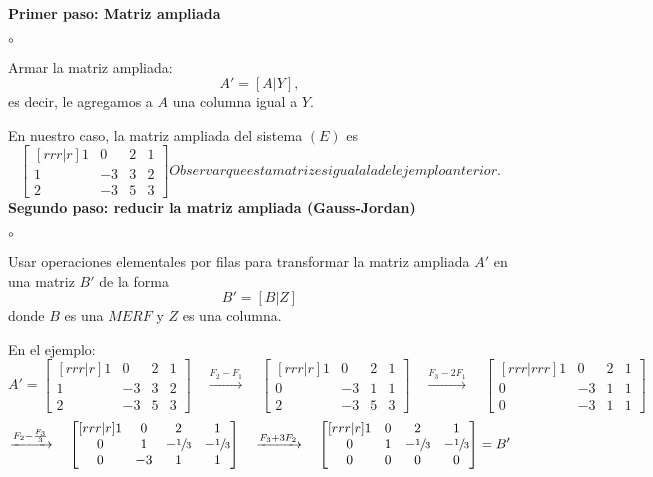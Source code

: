 \documentclass{article}
\theoremstyle{definition}
\theoremstyle{definition}
\theoremstyle{remark}
\begin{document}
\textbf{Primer paso: Matriz ampliada}
\begin{list}{$\circ$}{}  
\item  Armar la matriz ampliada: \[
    A'=[A|Y],
  \]
  es decir, le agregamos a $A$ una columna igual a $Y$.
\end{list}
En nuestro caso, la matriz ampliada del sistema $(E)$ es \[
  \begin{bmatrix}[rrr|r] 
    1 & 0 & 2 & 1 \\
    1 & -3 & 3 & 2 \\
    2 & -3 & 5 & 3 
  \end{bmatrix}
Observar que esta matriz es igual a la del ejemplo anterior.
\]
\textbf{Segundo paso: reducir la matriz ampliada (Gauss-Jordan)}
\begin{list}{$\circ$}{}  
\item  Usar operaciones elementales por filas para transformar la matriz ampliada $A'$ en una matriz $B'$ de la forma \[
    B'=[B|Z]
  \]
  donde $B$ es una $MERF$ y $Z$ es una columna.
\end{list}
En el ejemplo: \[
  A'= \begin{bmatrix}[rrr|r] 1 & 0 & 2 & 1 \\ 1 & -3 & 3 & 2 \\ 2 & -3 & 5 & 3 \end{bmatrix}\quad \xrightarrow{F_2-F_1} \quad
    \begin{bmatrix}[rrr|r]
      1 & 0 & 2 & 1 \\
      0 & -3 & 1 & 1 \\
      2 & -3 & 5 & 3
      \end{bmatrix} \quad \xrightarrow{F_3-2F_1}\quad \begin{bmatrix}[rrr|rrr]
      1 & 0 & 2 & 1 \\
      0 & -3 & 1 & 1 \\
      0 & -3 & 1 & 1 
    \end{bmatrix}\]
    \[
      \xrightarrow{F_2-\frac{F_3}{3}} \quad \begin{bmatrix}[rrr|r]1 & 0 & 2 & 1 \\ 0 & 1 & -\sfrac{1}{3} & -\sfrac{1}{3} \\ 0 & -3 & 1 & 1 \end{bmatrix} \quad \xrightarrow{F_3+3F_2} \quad \begin{bmatrix}[rrr|r] 1 & 0 & 2 & 1 \\ 0 & 1 & -\sfrac{1}{3} & -\sfrac{1}{3} \\ 0 & 0 & 0 & 0 \end{bmatrix} = B'
\]
\pagebreak 
\end{document}
